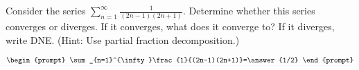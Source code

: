 \documentclass{ximera}
\author{Gregory Hartman \and Matthew Carr}
\begin{document}
\begin{exercise}




Consider the series $\sum_{n=1}^{\infty}\frac{1}{(2n-1)(2n+1)}$. Determine whether this series converges or diverges. If it converges, what does it converge to? If it diverges, write DNE. (Hint: Use partial fraction decomposition.)


\[
\begin{prompt}
\sum_{n=1}^{\infty}\frac{1}{(2n-1)(2n+1)}=\answer{1/2}
\end{prompt}
\]
\end{exercise}
\end{document}
